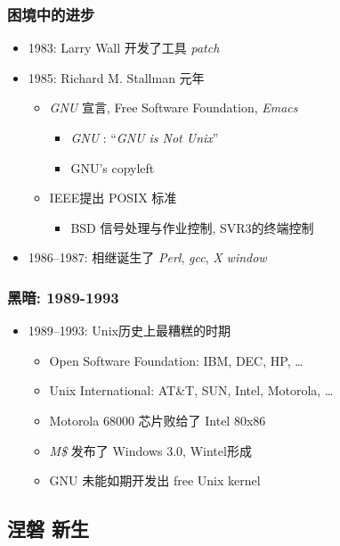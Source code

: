 \documentclass[compress]{beamer}
\begin{document}
\begin{frame}
\frametitle{困境中的进步}
\begin{itemize}
\item 1983: Larry Wall 开发了工具 \emph{\textit{patch}}
\item 1985: Richard M. Stallman 元年
    \begin{itemize}
        \item \emph{GNU} 宣言, Free Software Foundation,
        \emph{Emacs}
            \begin{itemize}
                \item \emph{GNU} : ``\emph{GNU is Not Unix}''
                \item GNU's copyleft
            \end{itemize}
        \item IEEE提出 POSIX 标准
            \begin{itemize}
            \item BSD 信号处理与作业控制, SVR3的终端控制
            \end{itemize}
    \end{itemize}
\item 1986--1987: 相继诞生了 \emph{Perl}, \emph{gcc}, \emph{X window}
\end{itemize}
\end{frame}

\begin{frame}
\frametitle{黑暗: 1989-1993}
\begin{itemize}
\item 1989--1993: Unix历史上最糟糕的时期
    \begin{itemize}
        \item Open Software Foundation: IBM, DEC, HP, \ldots
        \item Unix International: AT\&T, SUN, Intel, Motorola,
        \ldots
        \item Motorola 68000 芯片败给了 Intel 80x86 
        \item \emph{M\$} 发布了 Windows 3.0, Wintel形成
        \item GNU 未能如期开发出 free Unix kernel
    \end{itemize}
\end{itemize}
\end{frame}

\subsection{涅磐 新生}
\end{document}
